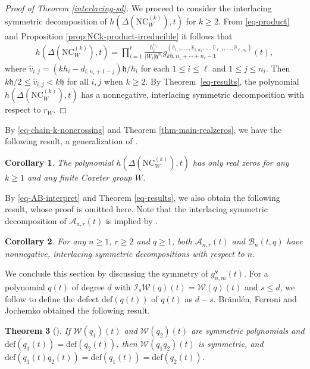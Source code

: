 \documentclass[12pt]{article}
\newtheorem{thm}{Theorem}[section]
\newtheorem{cor}[thm]{Corollary}
\newcommand{\NC}{\mathrm{NC}}
\numberwithin{equation}{section}
\begin{document}
\begin{proof}[Proof of Theorem \ref{interlacing-sd}]
We proceed to consider the interlacing symmetric decomposition of $h(\Delta(\NC^{(k)}_W),t)$ for $k\geq 2$.
From \eqref{eq-product} and Proposition \ref{prop:NCk-product-irreducible} it follows that
\begin{align}\label{eq-chain-k-noncrossing}
h\left(\Delta(\NC_W^{(k)}),t\right)=\prod_{i=1}^{\ell}\frac{h_i^{n_i}}{|W_i|\mathfrak{h}^{n_i}}g^{(\hat{v}_{1,1},\ldots,\hat{v}_{1,n_1},\ldots,\hat{v}_{\ell,1},\ldots,\hat{v}_{\ell,n_{\ell}})}_{k\mathfrak{h},n_1+\cdots+n_{\ell}-1}(t),
\end{align}
where $\hat{v}_{i,j}=(kh_i-d_{i,n_i+1-j})\mathfrak{h}/h_i$ for each $1\leq i\leq \ell$ and $1\leq j\leq n_i$. 
Then $k\mathfrak{h}/2\le \hat{v}_{i,j}<k\mathfrak{h}$ for all $i,j$ when $k\ge2$. 
By Theorem~\ref{eq-results}, the polynomial $h(\Delta(\NC^{(k)}_W),t)$ has a nonnegative, interlacing symmetric decomposition with respect to $r_W$.
\end{proof}

By \eqref{eq-chain-k-noncrossing} and Theorem \ref{thm-main-realzeros}, we have the following result, a generalization of \cite[Theorem 3 (a)]{Athanasiadis-Douvropoulos-Kalampogia-Evangelinou-2024}.

\begin{cor}
The polynomial $h\left(\Delta(\NC_W^{(k)}),t\right)$ has only real zeros for any $k\geq 1$ and any finite Coxeter group $W$. 
\end{cor}

By \eqref{eq-AB-interpret} and Theorem \ref{eq-results}, we also obtain the following result, whose proof is omitted here. 
Note that the interlacing symmetric decomposition of $\mathcal{A}_{n,r}(t)$ is implied by \cite[Corollary 3.2 and Theorem 2.6]{Branden-2021}.

\begin{cor}
For any $n\ge 1$, $r\ge 2$ and $q\ge 1$, both $\mathcal{A}_{n,r}(t)$ and $\mathcal{B}_n(t,q)$ have nonnegative, interlacing symmetric decompositions with respect to $n$.
\end{cor}

We conclude this section by discussing the symmetry of $g^{\mathbf{v}}_{n,m}(t)$. 
For a polynomial $q(t)$ of degree $d$ with $\mathcal{I}_s\mathcal{W}(q)(t)=\mathcal{W}(q)(t)$ and $s\le d$, 
we follow \cite{Branden-2024} to define the defect $\mathrm{def}(q(t))$ of $q(t)$ as $d-s$. Br\"and\'en, Ferroni and Jochemko obtained the following result. 

\begin{thm}[{\cite[Theorem 1.3]{Branden-2024}}]\label{thm-symmetry-preservation}
If $\mathcal{W}(q_1)(t)$ and $\mathcal{W}(q_2)(t)$ are symmetric polynomials and $\mathrm{def}(q_1(t))=\mathrm{def}(q_2(t))$, then $\mathcal{W}(q_1q_2)(t)$ is symmetric, and $\mathrm{def}(q_1(t)q_2(t))=\mathrm{def}(q_1(t))=\mathrm{def}(q_2(t))$.
\end{thm}
\end{document}
